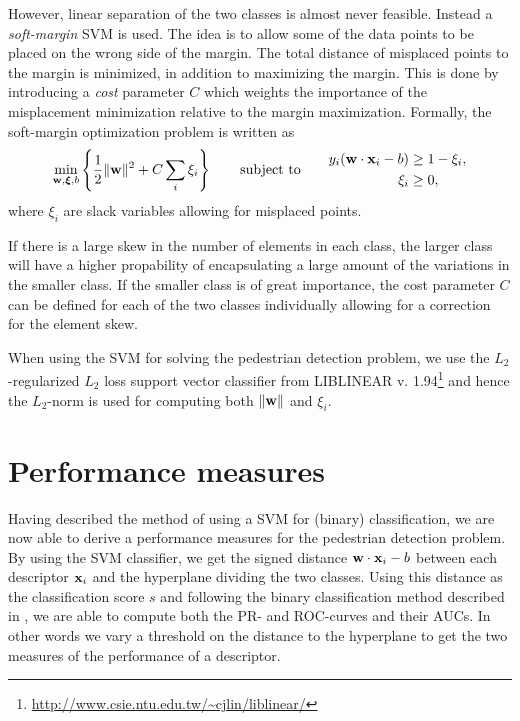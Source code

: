 \documentclass[thesis.tex]{subfiles}
\begin{document}
However, linear separation of the two classes is almost never feasible. Instead a \emph{soft-margin} SVM is used. The idea is to allow some of the data points to be placed on the wrong side of the margin. The total distance of misplaced points to the margin is minimized, in addition to maximizing the margin. This is done by introducing a \emph{cost} parameter $C$ which weights the importance of the misplacement minimization relative to the margin maximization. Formally, the soft-margin optimization problem is written as
%
\begin{align*}
\min_{\mathbf{w},\boldsymbol{\xi},b} \left\{ \frac12 \| \mathbf{w} \|^2 + C \sum_i \xi_i \right\} \qquad \text{subject to} \qquad \begin{aligned} y_i (\mathbf{w} \cdot \mathbf{x}_i - b) &\geq 1 - \xi_i, \\ \xi_i &\geq 0, \end{aligned}
\end{align*}
%
where $\xi_i$ are slack variables allowing for misplaced points.

If there is a large skew in the number of elements in each class, the larger class will have a higher propability of encapsulating a large amount of the variations in the smaller class. If the smaller class is of great importance, the cost parameter $C$ can be defined for each of the two classes individually allowing for a correction for the element skew.

When using the SVM for solving the pedestrian detection problem, we use the $L_2$-regularized $L_2$ loss support vector classifier from LIBLINEAR v. 1.94\footnote{\url{http://www.csie.ntu.edu.tw/~cjlin/liblinear/}} \cite{fan2008liblinear} and hence the $L_2$-norm is used for computing both $\| \mathbf{w} \|$ and $\xi_i$.

\section{Performance measures}

Having described the method of using a SVM for (binary) classification, we are now able to derive a performance measures for the pedestrian detection problem. By using the SVM classifier, we get the signed distance $\mathbf{w} \cdot \mathbf{x}_i - b$ between each descriptor $\mathbf{x}_i$ and the hyperplane dividing the two classes. Using this distance as the classification score $s$ and following the binary classification method described in , we are able to compute both the PR- and ROC-curves and their AUCs. In other words we vary a threshold on the distance to the hyperplane to get the two measures of the performance of a descriptor.
\end{document}
